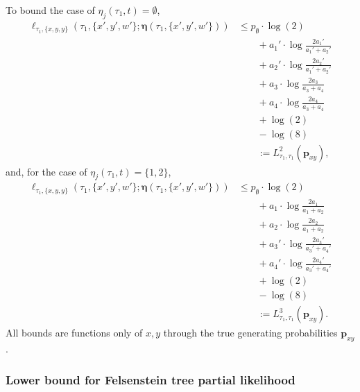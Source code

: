 \documentclass{article}
\newcommand{\ancestralSplitPartition}{\eta}
\newcommand{\fullAncestralSplitPartitions}{\boldsymbol\eta}
\begin{document}
To bound the case of $\ancestralSplitPartition_j(\tau_1, t) = \emptyset$,
\begin{align*}
    \ell_{\tau_1,\{x,y,y\}}(\tau_1, \{x',y',w'\}; \fullAncestralSplitPartitions(\tau_1,\{x',y',w'\}))
    &\le      p_{\emptyset}  \cdot\log(2) \\
    &\qquad + a_{1}'\cdot\log\frac{2a_{1}'}{a_{1}'+a_{2}'} \\
    &\qquad + a_{2}'\cdot\log\frac{2a_{2}'}{a_{1}'+a_{2}'} \\
    &\qquad + a_{3}\cdot\log\frac{2a_{3}}{a_{3}+a_{4}} \\
    &\qquad + a_{4}\cdot\log\frac{2a_{4}}{a_{3}+a_{4}} \\
    &\qquad + \log(2) \\
    &\qquad - \log(8) \\
    &\qquad := L^{2}_{\tau_1,\tau_1}(\mathbf{p}_{xy}),
\end{align*}
and, for the case of $\ancestralSplitPartition_j(\tau_1, t) = \{1,2\}$,
\begin{align*}
    \ell_{\tau_1,\{x,y,y\}}(\tau_1, \{x',y',w'\}; \fullAncestralSplitPartitions(\tau_1,\{x',y',w'\}))
    &\le      p_{\emptyset}  \cdot\log(2) \\
    &\qquad + a_{1}\cdot\log\frac{2a_{1}}{a_{1}+a_{2}} \\
    &\qquad + a_{2}\cdot\log\frac{2a_{2}}{a_{1}+a_{2}} \\
    &\qquad + a_{3}'\cdot\log\frac{2a_{3}'}{a_{3}'+a_{4}'} \\
    &\qquad + a_{4}'\cdot\log\frac{2a_{4}'}{a_{3}'+a_{4}'} \\
    &\qquad + \log(2) \\
    &\qquad - \log(8) \\
    &\qquad := L^{3}_{\tau_1,\tau_1}(\mathbf{p}_{xy}).
\end{align*}
All bounds are functions only of $x,y$ through the true generating probabilities $\mathbf{p}_{xy}$.

\subsubsection{Lower bound for Felsenstein tree partial likelihood}
\end{document}

